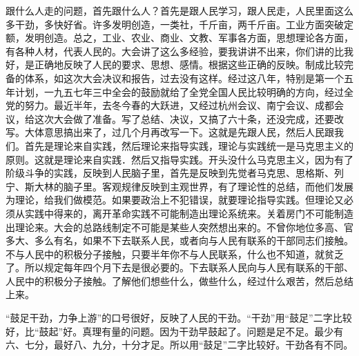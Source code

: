 跟什么人走的问题，首先跟什么人？首先是跟人民学习，跟人民走，人民里面这么多干劲，多快好省。许多发明创造，一类社，千斤亩，两千斤亩。工业方面突破定额，发明创造。总之，工业、农业、商业、文教、军事各方面，思想理论各方面，有各种人材，代表人民的。大会讲了这么多经验，要我讲讲不出来，你们讲的比我好，是正确地反映了人民的要求、思想、感情。根据这些正确的反映。制成比较完备的体系，如这次大会决议和报告，过去没有这样。经过这八年，特别是第一个五年计划，一九五七年三中全会的鼓励就给了全党全国人民比较明确的方向，经过全党的努力。最近半年，去冬今春的大跃进，又经过杭州会议、南宁会议、成都会议，给这次大会做了准备。写了总结、决议，又搞了六十条，还没完成，还要改写。大体意思搞出来了，过几个月再改写一下。这就是先跟人民，然后人民跟我们。首先是理论来自实践，然后理论来指导实践，理论与实践统一是马克思主义的原则。这就是理论来自实践．然后又指导实践。开头没什么马克思主义，因为有了阶级斗争的实践，反映到人民脑子里，首先是反映到先觉者马克思、思格斯、列宁、斯大林的脑子里。客观规律反映到主观世界，有了理论性的总结，而他们发展为理论，给我们做模范。如果要政治上不犯错误，就要理论指导实践。但理论又必须从实践中得来的，离开革命实践不可能制造出理论系统来。关着房门不可能制造出理论来。大会的总路线制定不可能是某些人突然想出来的。不曾你地位多高、官多大、多么有名，如果不下去联系人民，或者向与人民有联系的干部同志们接触。不与人民中的积极分子接触，只要半年你不与人民联系，什么也不知道，就贫乏了。所以规定每年四个月下去是很必要的。下去联系人民向与人民有联系的干部、人民中的积极分子接触。了解他们想些什么，做些什么，经过什么艰苦，然后总结上来。

“鼓足干劲，力争上游”的口号很好，反映了人民的干劲。“干劲”用“鼓足”二字比较好，比“鼓起”好。真理有量的问题。因为干劲早鼓起了。问题是足不足。最少有六、七分，最好八、九分，十分才足。所以用“鼓足”二字比较好。干劲各有不同。

